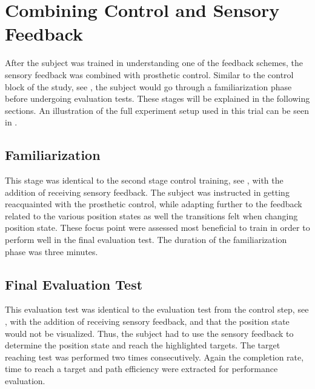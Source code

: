 \section{Combining Control and Sensory Feedback}
After the subject was trained in understanding one of the feedback schemes, the sensory feedback was combined with prosthetic control. Similar to the control block of the study, see , the subject would go through a familiarization phase before undergoing evaluation tests.  These stages will be explained in the following sections. An illustration of the full experiment setup used in this trial can be seen in .

\subsection{Familiarization}
This stage was identical to the second stage control training, see , with the addition of receiving sensory feedback. The subject was instructed in getting reacquainted with the prosthetic control, while adapting further to the feedback related to the various position states as well the transitions felt when changing position state. These focus point were assessed most beneficial to train in order to perform well in the final evaluation test. The duration of the familiarization phase was three minutes.

\subsection{Final Evaluation Test}
This evaluation test was identical to the evaluation test from the control step, see , with the addition of receiving sensory feedback, and that the position state would not be visualized. Thus, the subject had to use the sensory feedback to determine the position state and reach the highlighted targets. The target reaching test was performed two times consecutively. Again the completion rate, time to reach a target and path efficiency were extracted for performance evaluation.

